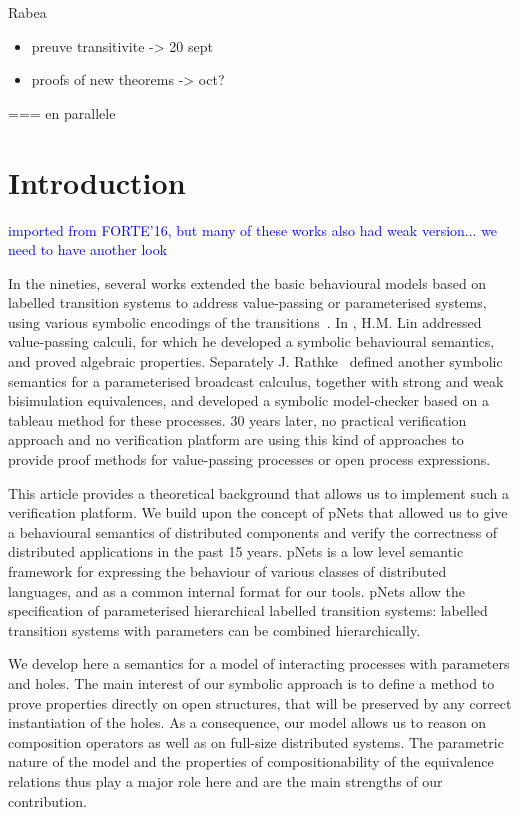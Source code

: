 \documentclass{lncs/llncs}
\newcommand{\ERIC}[1]{\textcolor{blue}{#1}}
\begin{document}
\medskip

Rabea
\begin{itemize}
\item preuve transitivite -> 20 sept
\item proofs of new theorems -> oct?
\end{itemize}
=== en parallele

\section{Introduction}

\ERIC{imported from FORTE'16, but many of these works also had weak
  version... we need to have another look}

In the nineties, several 
works extended the basic behavioural models based on labelled
transition systems to address value-passing or parameterised systems, using
various symbolic encodings of the
transitions~\cite{deSimone85,Larsen87,HennessyLin:TCS95,Linconcur96}. 
In \cite{Linconcur96}, H.M. Lin addressed value-passing calculi, for which he
developed a symbolic behavioural semantics, and proved algebraic properties.
Separately J. Rathke~\cite{HennessyRathke:TCS98} defined another
symbolic semantics for 
a parameterised broadcast calculus, together with strong and weak bisimulation
equivalences, and developed a symbolic model-checker based on a tableau
method for these processes. 30 years later, no
practical verification approach and no verification platform are
using this kind of approaches to provide proof methods for
value-passing processes or open process expressions. 


This article provides a theoretical background that allows us to implement such a verification platform. We build upon the concept of pNets that allowed us to give a behavioural semantics of distributed components and verify the correctness of distributed applications in the past 15 years. pNets  is a
low level semantic framework for expressing the behaviour of various
classes of distributed languages, and as a common internal format for
our tools.  pNets allow the
specification of parameterised hierarchical labelled
transition systems:  labelled transition systems with parameters can be
combined hierarchically.


We develop here a semantics for a model of interacting processes with parameters and holes. 
The main interest of our symbolic approach is to define a method to
prove properties directly on open structures, that will be preserved
by any correct instantiation of the holes.
As a consequence, our model allows us to reason on composition operators as well as on full-size distributed systems. The parametric nature of the model and the properties of compositionability of the equivalence relations thus play a major role here and are the main strengths of  our contribution.
\end{document}
